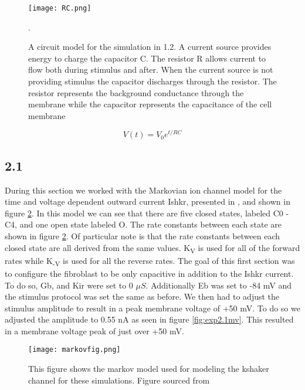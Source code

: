 \documentclass[12pt]{article}
\begin{document}
\begin{figure}[H]
	\centering
	\centering
	\texttt{[image: RC.png]}
	\caption{A circuit model for the simulation in 1.2. A current source provides energy to charge the capacitor C. The resistor R allows current to flow both during stimulus and after. When the current source is not providing stimulus the capacitor discharges through the resistor. The resistor represents the background conductance through the membrane while the capacitor represents the capacitance of the cell membrane}.
	\label{fig:exp1.rc}
\end{figure}

\begin{equation} 
V(t) = V_0 e^{t/RC} 
\label{eq:rc}
\end{equation}

\subsection{2.1}
\par{}

During this section we worked with the Markovian ion channel model for the time and voltage dependent outward current Ishkr, presented in \cite{Sachse2008}, and shown in figure \ref{fig:markModel}. In this model we can see that there are five closed states, labeled C0 - C4, and one open state labeled O. The rate constants between each state are shown in figure \ref{fig:markModel}. Of particular note is that the rate constants between each closed state are all derived from the same values. K\textsubscript{V} is used for all of the forward rates while K\textsubscript{-V} is used for all the reverse rates. The goal of this first section was to configure the fibroblast to be only capacitive in addition to the Ishkr current. To do so, Gb, and Kir were set to 0 \ensuremath{\mu S}. Additionally Eb was set to -84 mV and the stimulus protocol was set the same as before. We then had to adjust the stimulus amplitude to result in a peak membrane voltage of +50 mV. To do so we adjusted the amplitude to 0.55 nA as seen in figure \ref{fig:exp2.1mv}. This resulted in a membrane voltage peak of just over +50 mV. 

\begin{figure}[H]
	\centering
	\centering
	\texttt{[image: markovfig.png]}
	
	\caption{ This figure shows the markov model used for modeling the kshaker channel for these simulations. Figure sourced from \cite{Sachse2008}}
	\label{fig:markModel}
\end{figure}
\end{document}
